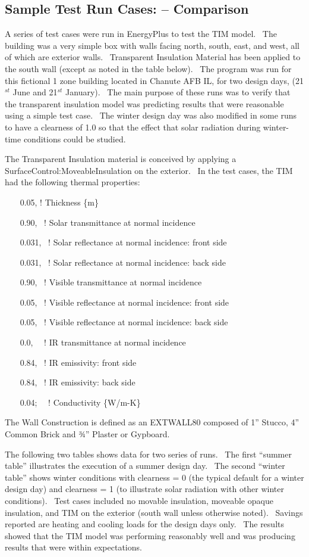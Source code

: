\subsection{Sample Test Run Cases: -- Comparison}\label{sample-test-run-cases-comparison}

A series of test cases were run in EnergyPlus to test the TIM model.~ The building was a very simple box with walls facing north, south, east, and west, all of which are exterior walls.~ Transparent Insulation Material has been applied to the south wall (except as noted in the table below).~ The program was run for this fictional 1 zone building located in Chanute AFB IL, for two design days, (21\(^{st}\) June and 21\(^{st}\) January).~ The main purpose of these runs was to verify that the transparent insulation model was predicting results that were reasonable using a simple test case.~ The winter design day was also modified in some runs to have a clearness of 1.0 so that the effect that solar radiation during winter-time conditions could be studied.

The Transparent Insulation material is conceived by applying a SurfaceControl:MoveableInsulation on the exterior.~ In the test cases, the TIM had the following thermal properties:

~~~ 0.05, ! Thickness \{m\}

~~~ 0.90,~ ! Solar transmittance at normal incidence

~~~ 0.031,~ ! Solar reflectance at normal incidence: front side

~~~ 0.031,~ ! Solar reflectance at normal incidence: back side

~~~ 0.90,~ ! Visible transmittance at normal incidence

~~~ 0.05,~ ! Visible reflectance at normal incidence: front side

~~~ 0.05,~ ! Visible reflectance at normal incidence: back side

~~~ 0.0,~~ ! IR transmittance at normal incidence

~~~ 0.84,~ ! IR emissivity: front side

~~~ 0.84,~ ! IR emissivity: back side

~~~ 0.04;~~ ! Conductivity \{W/m-K\}

The Wall Construction is defined as an EXTWALL80 composed of 1'' Stucco, 4'' Common Brick and ¾'' Plaster or Gypboard.

The following two tables shows data for two series of runs.~ The first ``summer table'' illustrates the execution of a summer design day.~ The second ``winter table'' shows winter conditions with clearness = 0 (the typical default for a winter design day) and clearness = 1 (to illustrate solar radiation with other winter conditions).~ Test cases included no movable insulation, moveable opaque insulation, and TIM on the exterior (south wall unless otherwise noted).~ Savings reported are heating and cooling loads for the design days only.~ The results showed that the TIM model was performing reasonably well and was producing results that were within expectations.

